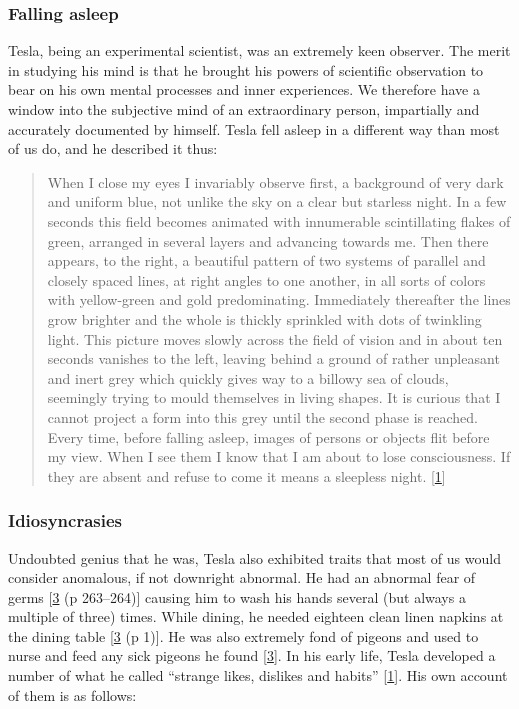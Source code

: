 \documentclass[
  a4paper,
]{article}
\begin{document}
\hypertarget{falling-asleep}{%
\subsubsection{Falling asleep}\label{falling-asleep}}

Tesla, being an experimental scientist, was an extremely keen observer.
The merit in studying his mind is that he brought his powers of
scientific observation to bear on his own mental processes and inner
experiences. We therefore have a window into the subjective mind of an
extraordinary person, impartially and accurately documented by himself.
Tesla fell asleep in a different way than most of us do, and he
described it thus:

\begin{quote}
When I close my eyes I invariably observe first, a background of very
dark and uniform blue, not unlike the sky on a clear but starless night.
In a few seconds this field becomes animated with innumerable
scintillating flakes of green, arranged in several layers and advancing
towards me. Then there appears, to the right, a beautiful pattern of two
systems of parallel and closely spaced lines, at right angles to one
another, in all sorts of colors with yellow-green and gold
predominating. Immediately thereafter the lines grow brighter and the
whole is thickly sprinkled with dots of twinkling light. This picture
moves slowly across the field of vision and in about ten seconds
vanishes to the left, leaving behind a ground of rather unpleasant and
inert grey which quickly gives way to a billowy sea of clouds, seemingly
trying to mould themselves in living shapes. It is curious that I cannot
project a form into this grey until the second phase is reached. Every
time, before falling asleep, images of persons or objects flit before my
view. When I see them I know that I am about to lose consciousness. If
they are absent and refuse to come it means a sleepless night.
{[}\protect\hyperlink{ref-john83}{1}{]}
\end{quote}

\hypertarget{idiosyncrasies}{%
\subsubsection{Idiosyncrasies}\label{idiosyncrasies}}

Undoubted genius that he was, Tesla also exhibited traits that most of
us would consider anomalous, if not downright abnormal. He had an
abnormal fear of germs {[}\protect\hyperlink{ref-cheney81}{3} (p
263--264){]} causing him to wash his hands several (but always a
multiple of three) times. While dining, he needed eighteen clean linen
napkins at the dining table {[}\protect\hyperlink{ref-cheney81}{3} (p
1){]}. He was also extremely fond of pigeons and used to nurse and feed
any sick pigeons he found {[}\protect\hyperlink{ref-cheney81}{3}{]}. In
his early life, Tesla developed a number of what he called ``strange
likes, dislikes and habits'' {[}\protect\hyperlink{ref-john83}{1}{]}.
His own account of them is as follows:
\end{document}
